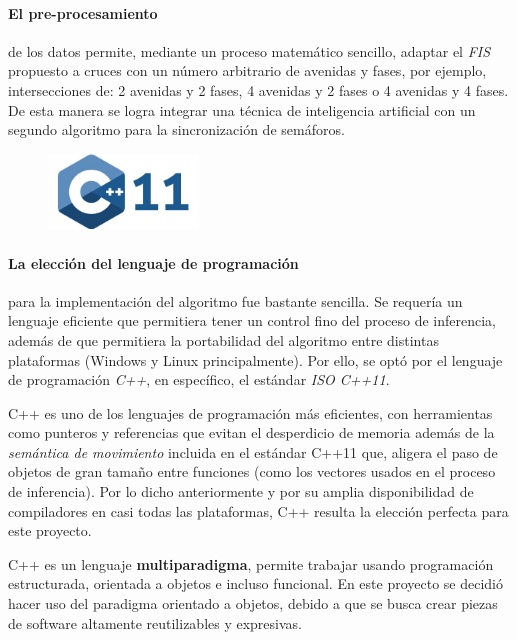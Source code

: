 
\paragraph{El pre-procesamiento} de los datos permite, mediante un proceso matemático sencillo, adaptar el \emph{FIS} propuesto a cruces con un número arbitrario de avenidas y fases, por ejemplo, intersecciones de: 2 avenidas y 2 fases, 4 avenidas y 2 fases o 4 avenidas y 4 fases. De esta manera se logra integrar una técnica de inteligencia artificial con un segundo algoritmo para la sincronización de semáforos.

\begin{figure}
	\includegraphics[width=4cm]{Sources/logo_cpp11.jpg}
\end{figure}

\paragraph{La elección del lenguaje de programación} para la implementación del algoritmo fue bastante sencilla. Se requería un lenguaje eficiente que permitiera tener un control fino del proceso de inferencia, además de que permitiera la portabilidad del algoritmo entre distintas plataformas (Windows y Linux principalmente). Por ello, se optó por el lenguaje de programación \emph{C++}, en específico, el estándar \emph{ISO C++11}.

C++ es uno de los lenguajes de programación más eficientes, con herramientas como punteros y referencias que evitan el desperdicio de memoria además de la \emph{semántica de movimiento} incluida en el estándar \textsc{C++11} que, aligera el paso de objetos de gran tamaño entre funciones (como los vectores usados en el proceso de inferencia). Por lo dicho anteriormente y por su amplia disponibilidad de compiladores en casi todas las plataformas, C++ resulta la elección perfecta para este proyecto.

C++ es un lenguaje \textbf{multiparadigma}, permite trabajar usando programación estructurada, orientada a objetos e incluso funcional. En este proyecto se decidió hacer uso del paradigma orientado a objetos, debido a que se busca crear piezas de software altamente reutilizables y expresivas.

